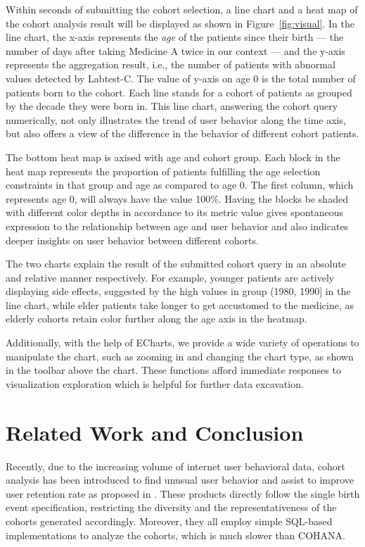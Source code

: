 Within seconds of submitting the cohort selection, a line chart and a heat map of the cohort analysis result will be displayed as shown in Figure~\ref{fig:visual}. In the line chart, the x-axis represents the \emph{age} of the patients since their {birth} --- the number of days after taking Medicine A twice in our context --- and the y-axis represents the aggregation result, i.e., the number of patients with abnormal values detected by Labtest-C. The value of y-axis on {age 0} is the total number of patients {born} to the cohort. 
Each line stands for a cohort of patients as grouped by the decade they were born in. 
This line chart, answering the cohort query numerically, not only illustrates the trend of user behavior along the time axis, but also offers a view of
the difference in the behavior of different cohort patients.

The bottom heat map is axised with {age} and cohort group. 
Each block in the heat map represents the proportion of patients fulfilling the age selection constraints in that group and {age} as compared to {age 0}. 
The first column, which represents {age 0}, will always have the value 100\%. 
Having the blocks be shaded with different color depths in accordance to its metric value gives spontaneous expression to the relationship between {age} and user behavior and also indicates deeper insights on user behavior between different cohorts. 

The two charts explain the result of the submitted cohort query in an absolute and relative manner respectively. For example, younger patients are actively displaying side effects, suggested by the high values in group (1980, 1990] in the line chart, while elder patients take longer to get accustomed to the medicine, as elderly cohorts retain color further along the age axis in the heatmap.

Additionally, with the help of ECharts\cite{echarts}, we provide a wide variety of operations to manipulate the chart, such as zooming in and changing the chart type, as shown in the toolbar above the chart. These functions afford immediate responses to visualization exploration which is helpful for further data excavation.

\section{Related Work and Conclusion}

Recently, due to the increasing volume of internet user behavioral data, cohort
analysis has been introduced to find unusual user behavior and assist to
improve user retention rate as proposed in \cite{amplitude, mixpanel, rjmetrics}. These
products directly follow the single birth event specification, restricting the diversity and the representativeness of the cohorts generated accordingly.
Moreover, they all employ simple SQL-based implementations to analyze the cohorts, which is much slower than COHANA.

